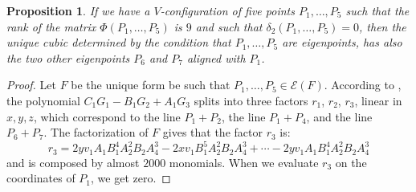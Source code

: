 \documentclass{amsart}
\theoremstyle{plain}
\newtheorem{prop}[lemma]{Proposition}
\theoremstyle{definition}
\newcommand{\p}{\mathbb{P}}
\newcommand{\Eig}[1]{\mathcal{E}\!\left( {#1} \right)}
\newcommand{\blue}[1]{{\color{blue}  [#1]}}
\begin{document}
%

\begin{prop}
\label{proposition:terzo_allineamento}
If we have a $V$-configuration of five points $P_1, \dots, P_5$
such that the rank of the matrix $\Phi(P_1, \dots, P_5)$ is $9$ and
such that $\delta_2(P_1, \dots, P_5) = 0$,
then the unique cubic determined by the condition that $P_1, \dots, P_5$
are eigenpoints, has also the two other eigenpoints $P_6$ and $P_7$
aligned with $P_1$.
\end{prop}
\begin{proof}
Let $F$ be the unique form be such that $P_1, \dotsc, P_5 \in \Eig{F}$.
According to , the polynomial
$C_1G_1-B_1G_2+A_1G_3$ splits into three factors $r_1$, $r_2$, $r_3$,
linear in $x, y, z$, which
correspond to the line $P_1+P_2$, the line $P_1+P_4$, and the line $P_6+P_7$.
The factorization of $F$ gives that the factor $r_3$ is:
\[
r_3 = 2yv_1A_1B_1^4A_2^2B_2A_4^3-2xv_1B_1^5A_2^2B_2A_4^3+\cdots
-2 yv_1A_1B_1^4A_2^2B_2A_4^3
\]
and is composed by almost $2000$ monomials. When we
evaluate $r_3$ on the coordinates of $P_1$, we get zero.
\end{proof}
\end{document}
